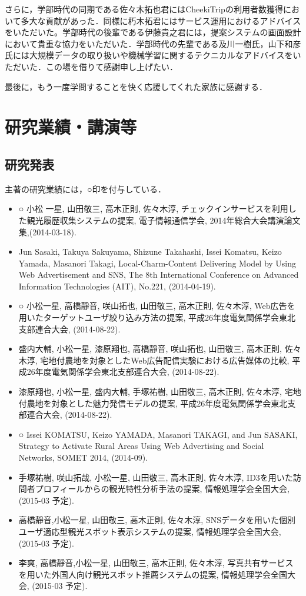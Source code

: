 \documentclass{jsarticle}
\begin{document}
さらに，学部時代の同期である佐々木拓也君にはCheekiTripの利用者数獲得において多大な貢献があった．同様に朽木拓君にはサービス運用におけるアドバイスをいただいた。学部時代の後輩である伊藤貴之君には，提案システムの画面設計において貴重な協力をいただいた．学部時代の先輩である及川一樹氏，山下和彦氏には大規模データの取り扱いや機械学習に関するテクニカルなアドバイスをいただいた．この場を借りて感謝申し上げたい．

最後に，もう一度学問することを快く応援してくれた家族に感謝する．

\newpage

\section*{研究業績・講演等}

\subsection*{研究発表}

主著の研究業績には，○印を付与している．

\begin{itemize}
\item ○ 小松 一星, 山田敬三, 高木正則, 佐々木淳, チェックインサービスを利用した観光履歴収集システムの提案, 電子情報通信学会, 2014年総合大会講演論文集,(2014-03-18).
\item Jun Sasaki, Takuya Sakuyama, Shizune Takahashi, Issei Komatsu, Keizo Yamada, Masanori Takagi, Local-Charm-Content Delivering Model by Using Web Advertisement and SNS, The 8th International Conference on Advanced Information Technologies (AIT), No.221, (2014-04-19).
\item ○ 小松一星, 高橋靜音, 咲山拓也, 山田敬三, 高木正則, 佐々木淳, Web広告を用いたターゲットユーザ絞り込み方法の提案, 平成26年度電気関係学会東北支部連合大会, (2014-08-22).
\item 盛内大輔, 小松一星, 漆原翔也, 高橋靜音, 咲山拓也, 山田敬三, 高木正則, 佐々木淳, 宅地付農地を対象としたWeb広告配信実験における広告媒体の比較, 平成26年度電気関係学会東北支部連合大会, (2014-08-22).
\item 漆原翔也, 小松一星, 盛内大輔, 手塚祐樹, 山田敬三, 高木正則, 佐々木淳, 宅地付農地を対象とした魅力発信モデルの提案, 平成26年度電気関係学会東北支部連合大会, (2014-08-22).
\item ○ Issei KOMATSU, Keizo YAMADA, Masanori TAKAGI,  and Jun SASAKI, Strategy to Activate Rural Areas Using Web Advertising and Social Networks, SOMET 2014, (2014-09).
\item 手塚祐樹, 咲山拓哉, 小松一星, 山田敬三, 高木正則, 佐々木淳, ID3を用いた訪問者プロフィールからの観光特性分析手法の提案, 情報処理学会全国大会, (2015-03 予定).
\item 高橋靜音,小松一星, 山田敬三, 高木正則, 佐々木淳, SNSデータを用いた個別ユーザ適応型観光スポット表示システムの提案, 情報処理学会全国大会, (2015-03 予定).
\item 李爽, 高橋靜音,小松一星, 山田敬三, 高木正則, 佐々木淳, 写真共有サービスを用いた外国人向け観光スポット推薦システムの提案, 情報処理学会全国大会, (2015-03 予定).
\end{itemize}
\end{document}
